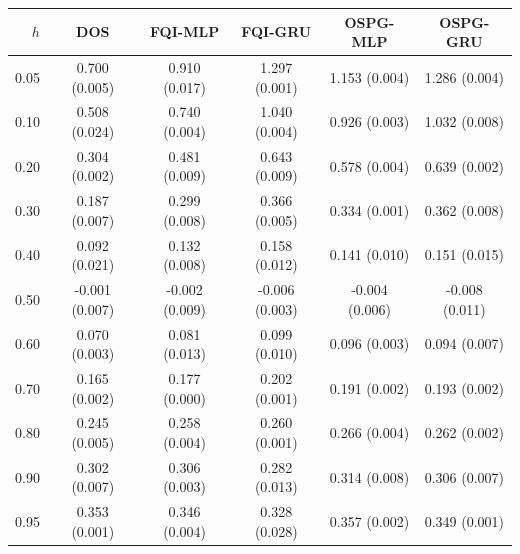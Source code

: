 \begin{tabular}{rccccc}
\toprule
$h$ & DOS & FQI-MLP & FQI-GRU & OSPG-MLP & OSPG-GRU \\
\midrule
0.05 & 0.700 (0.005) & 0.910 (0.017) & 1.297 (0.001) & 1.153 (0.004) & 1.286 (0.004) \\
0.10 & 0.508 (0.024) & 0.740 (0.004) & 1.040 (0.004) & 0.926 (0.003) & 1.032 (0.008) \\
0.20 & 0.304 (0.002) & 0.481 (0.009) & 0.643 (0.009) & 0.578 (0.004) & 0.639 (0.002) \\
0.30 & 0.187 (0.007) & 0.299 (0.008) & 0.366 (0.005) & 0.334 (0.001) & 0.362 (0.008) \\
0.40 & 0.092 (0.021) & 0.132 (0.008) & 0.158 (0.012) & 0.141 (0.010) & 0.151 (0.015) \\
0.50 & -0.001 (0.007) & -0.002 (0.009) & -0.006 (0.003) & -0.004 (0.006) & -0.008 (0.011) \\
0.60 & 0.070 (0.003) & 0.081 (0.013) & 0.099 (0.010) & 0.096 (0.003) & 0.094 (0.007) \\
0.70 & 0.165 (0.002) & 0.177 (0.000) & 0.202 (0.001) & 0.191 (0.002) & 0.193 (0.002) \\
0.80 & 0.245 (0.005) & 0.258 (0.004) & 0.260 (0.001) & 0.266 (0.004) & 0.262 (0.002) \\
0.90 & 0.302 (0.007) & 0.306 (0.003) & 0.282 (0.013) & 0.314 (0.008) & 0.306 (0.007) \\
0.95 & 0.353 (0.001) & 0.346 (0.004) & 0.328 (0.028) & 0.357 (0.002) & 0.349 (0.001) \\
\bottomrule
\end{tabular}
